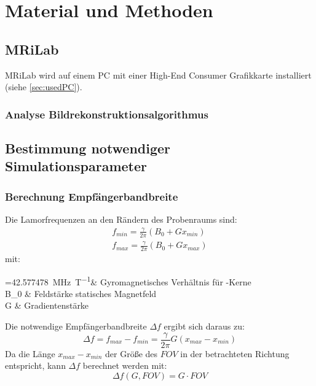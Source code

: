 \chapter{Material und Methoden}

\section{MRiLab}

MRiLab wird auf einem PC mit einer High-End Consumer Grafikkarte installiert (siehe \autoref{sec:usedPC}). 

\subsection{Analyse Bildrekonstruktionsalgorithmus}

\section{Bestimmung notwendiger Simulationsparameter}

\subsection{Berechnung Empfängerbandbreite}

Die Lamorfrequenzen an den Rändern des Probenraums sind:
\begin{subequations}
	\begin{align}
	f_{min}=\frac{\gamma}{2\pi} (B_0+G x_{min}) \\
	f_{max}=\frac{\gamma}{2\pi} (B_0+G x_{max})
	\end{align}
\end{subequations}
mit:
\begin{with}
	\frac{\gamma}{2\pi} =\SI{42.577478}{\mega\hertz\per\tesla}& Gyromagnetisches Verhältnis für -Kerne \\
	B_0  & Feldstärke statisches Magnetfeld \\
	G  & Gradientenstärke \\
\end{with}

Die notwendige Empfängerbandbreite $\Delta f$ ergibt sich daraus zu:
\begin{equation}
\Delta f = f_{max}-f_{min} = \frac{\gamma}{2\pi} G (x_{max}-x_{min})
\end{equation}
Da die Länge $x_{max}-x_{min}$ der Größe des $FOV$ in der betrachteten Richtung entspricht, kann $\Delta f$ berechnet werden mit:
\begin{equation}
\label{eq:deltaF}
\Delta f(G, FOV) = G \cdot FOV
\end{equation}

